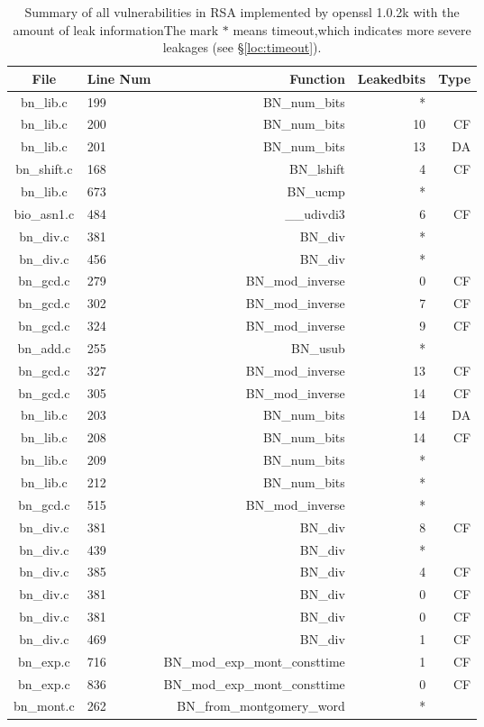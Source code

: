 \begin{table*}%
\centering
\caption{Summary of all vulnerabilities in RSA implemented by openssl 1.0.2k with the amount of leak informationThe mark $*$ means timeout,which indicates more severe leakages (see \S\ref{loc:timeout}).}\label{tab:RSAopenssl}
\begin{tabular}{clrrr}
\hline
\textbf{File} & \textbf{Line Num} & \textbf{Function} & \textbf{Leakedbits} & \textbf{Type} \\\hline
bn\_lib.c& 199&BN\_num\_bits&*&\\
bn\_lib.c& 200&BN\_num\_bits&10&CF\\
bn\_lib.c& 201&BN\_num\_bits&13&DA\\
bn\_shift.c& 168&BN\_lshift&4 &CF\\
bn\_lib.c& 673&BN\_ucmp&*&\\
bio\_asn1.c& 484&\_\_udivdi3&6 &CF\\
bn\_div.c& 381&BN\_div&*&\\
bn\_div.c& 456&BN\_div&*&\\
bn\_gcd.c& 279&BN\_mod\_inverse&0 &CF\\
bn\_gcd.c& 302&BN\_mod\_inverse&7 &CF\\
bn\_gcd.c& 324&BN\_mod\_inverse&9 &CF\\
bn\_add.c& 255&BN\_usub&*&\\
bn\_gcd.c& 327&BN\_mod\_inverse&13&CF\\
bn\_gcd.c& 305&BN\_mod\_inverse&14&CF\\
bn\_lib.c& 203&BN\_num\_bits&14&DA\\
bn\_lib.c& 208&BN\_num\_bits&14&CF\\
bn\_lib.c& 209&BN\_num\_bits&*&\\
bn\_lib.c& 212&BN\_num\_bits&*&\\
bn\_gcd.c& 515&BN\_mod\_inverse&*&\\
bn\_div.c& 381&BN\_div&8 &CF\\
bn\_div.c& 439&BN\_div&*&\\
bn\_div.c& 385&BN\_div&4 &CF\\
bn\_div.c& 381&BN\_div&0 &CF\\
bn\_div.c& 381&BN\_div&0 &CF\\
bn\_div.c& 469&BN\_div&1 &CF\\
bn\_exp.c& 716&BN\_mod\_exp\_mont\_consttime&1 &CF\\
bn\_exp.c& 836&BN\_mod\_exp\_mont\_consttime&0 &CF\\
bn\_mont.c& 262&BN\_from\_montgomery\_word&*&\\

\end{tabular}
\end{table*}
